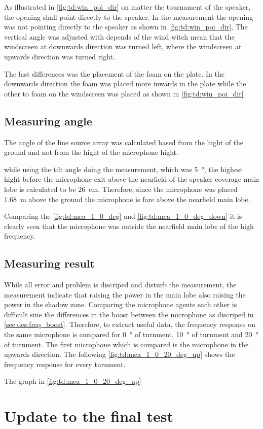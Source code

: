 As illustrated in \autoref{fig:td:win_poi_dir} on matter the tournament of the speaker, the opening shall point directly to the speaker. In the measurement the opening was not pointing directly to the speaker as shown in \autoref{fig:td:win_poi_dir}, The vertical angle was adjusted with depends of the wind witch mean that the windscreen at downwards direction was turned left, where the windscreen at upwards direction was turned right. 

The last differences was the placement of the foam on the plate. In the downwards direction the foam was placed more inwards in the plate while the other to foam on the windscreen was placed as shown in \autoref{fig:td:win_poi_dir}


\subsection{Measuring angle}
The angle of the line source array was calculated based from the hight of the ground and not from the hight of the microphone hight.



while using the tilt angle doing the measurement, which was \SI{5}{\degree}, the highest hight before the microphone exit above the nearfield of the speaker coverage main lobe is calculated to be \SI{26}{\centi\meter}. Therefore, since the microphone was placed \SI{1.68}{\meter} above the ground the microphone is fare above the nearfield main lobe.

Comparing the \autoref{fig:td:mea_1_0_deg} and \autoref{fig:td:mea_1_0_deg_down} it is clearly seen that the microphone was outside the nearfield main lobe of the high frequency.

\subsection{Measuring result}
While all error and problem is discriped and disturb the measurement, the measurement indicate that raising the power in the main lobe also raising the power in the shadow zone. Comparing the microphone agents each other is difficult sine the differences in the boost between the microphone as discriped in \autoref{sec:des:freq_boost}. Therefore, to extract useful data, the frequency response on the same microphone is compared for \SI{0}{\degree} of turnment, \SI{10}{\degree} of turnment and \SI{20}{\degree} of turnment.   
The first microphone which is compared is the microphone in the upwards direction. The following \autoref{fig:td:mea_1_0_20_deg_up} shows the frequency response for every turnment.

The graph in \autoref{fig:td:mea_1_0_20_deg_up}





\section{Update to the final test}






